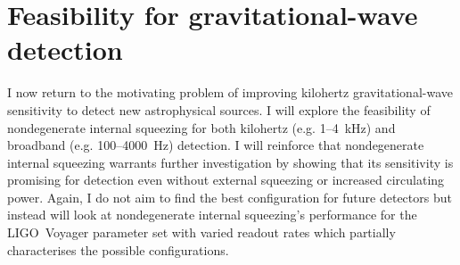 


\section{Feasibility for gravitational-wave detection}
\label{sec:nIS_sigRO_feasibility}

I now return to the motivating problem of improving kilohertz gravitational-wave sensitivity to detect new astrophysical sources. I will explore the feasibility of nondegenerate internal squeezing for both kilohertz (e.g. 1--4~kHz) and broadband (e.g. 100--4000~Hz) detection. I will reinforce that nondegenerate internal squeezing warrants further investigation by showing that its sensitivity is promising for detection even without external squeezing or increased circulating power. Again, I do not aim to find the best configuration for future detectors but instead will look at nondegenerate internal squeezing's performance for the LIGO~Voyager parameter set with varied readout rates which partially characterises the possible configurations.


